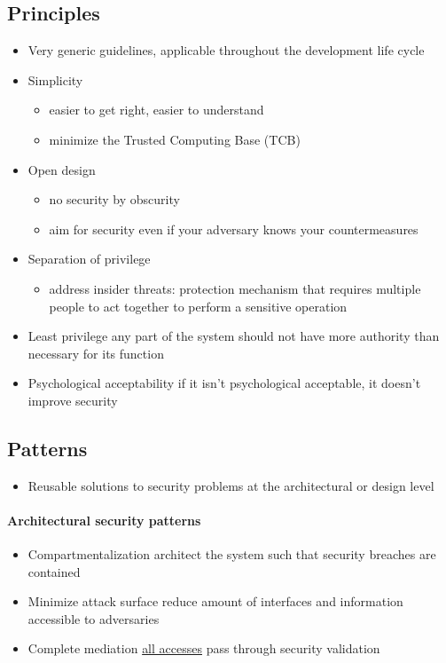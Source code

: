 \documentclass[12pt,titlepage,a4paper]{report}
\begin{document}
			\subsection{Principles}
			\begin{itemize}
				\item[\textrightarrow] Very generic guidelines, applicable throughout the development life cycle
				\item Simplicity
				\begin{itemize}
					\item easier to get right, easier to understand
					\item minimize the Trusted Computing Base (TCB)
				\end{itemize}
				\item Open design
				\begin{itemize}
					\item no security by obscurity
					\item aim for security even if your adversary knows your countermeasures
				\end{itemize}
				\item Separation of privilege
				\begin{itemize}
					\item address insider threats: protection mechanism that requires multiple people to act together to perform a sensitive operation
				\end{itemize}
				\item Least privilege
					\subitem any part of the system should not have more authority than necessary for its function
				\item Psychological acceptability
					\subitem if it isn't psychological acceptable, it doesn't improve security
			\end{itemize}
			
			\subsection{Patterns}
			\begin{itemize}
				\item[\textrightarrow] Reusable solutions to security problems at the architectural or design level
			\end{itemize}
			\paragraph{Architectural security patterns}
			\begin{itemize}
				\item Compartmentalization
					\subitem architect the system such that security breaches are contained
				\item Minimize attack surface
					\subitem reduce amount of interfaces and information accessible to adversaries
				\item Complete mediation
					\subitem \underline{all accesses} pass through security validation
			\end{itemize}
\end{document}
